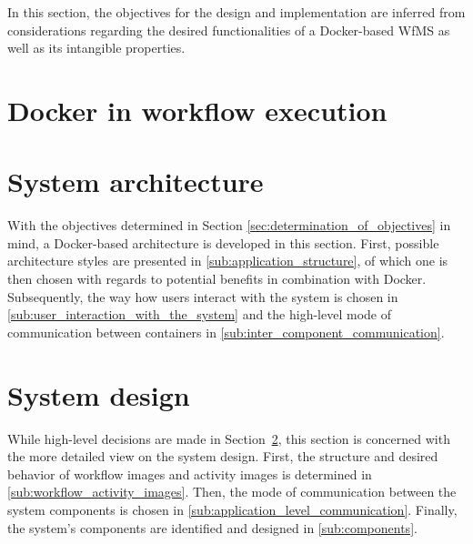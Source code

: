 \documentclass[language=english,noinputenc]{wiwwuwordrprt}
\begin{document}
      In this section, the objectives for the design and implementation are inferred from considerations regarding the desired functionalities of a Docker-based \ac{WfMS} as well as its intangible properties.

      

    \section{Docker in workflow execution} %
      \label{sec:docker_for_wf_execution}
      

    \section{System architecture} %
      \label{sec:architecture}

      With the objectives determined in Section \ref{sec:determination_of_objectives} in mind, a Docker-based architecture is developed in this section. First, possible architecture styles are presented in \ref{sub:application_structure}, of which one is then chosen with regards to potential benefits in combination with Docker. Subsequently, the way how users interact with the system is chosen in \ref{sub:user_interaction_with_the_system} and the high-level mode of communication between containers in \ref{sub:inter_component_communication}.

      

    \section{System design} %
      \label{sec:design}

      While high-level decisions are made in Section~\ref{sec:architecture}, this section is concerned with the more detailed view on the system design.
      First, the structure and desired behavior of workflow images and activity images is determined in \ref{sub:workflow_activity_images}. Then, the mode of communication between the system components is chosen in \ref{sub:application_level_communication}. Finally, the system's components are identified and designed in \ref{sub:components}.

      
\end{document}
